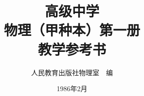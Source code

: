 \documentclass[a4paper, openany]{ctexbook}
\theoremstyle{plain}
\begin{document}
\fontsize{11}{14}\selectfont














\title{高级中学\\物理（甲种本）第一册\\教学参考书}



\author{人民教育出版社物理室~~编}
\date{1986年2月}

\maketitle

\tableofcontents


\frontmatter



\mainmatter















%
\backmatter
%



%	
\end{document}
